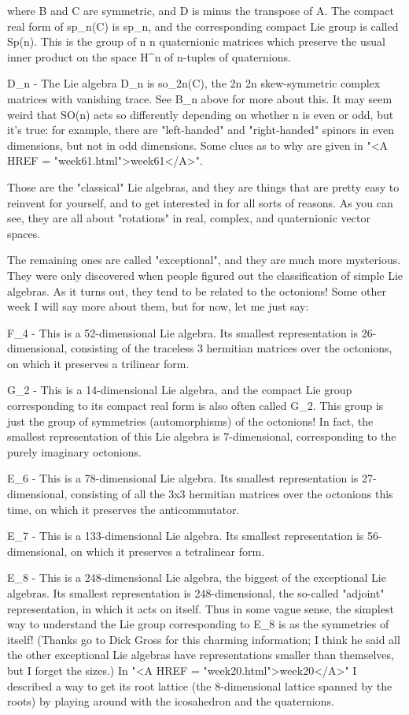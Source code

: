 where B and C are symmetric, and D is minus the transpose of A.  The
compact real form of sp_{n}(C) is sp_{n}, and the
corresponding compact Lie group is called Sp(n).  This is the group of
n \times  n quaternionic matrices which preserve the usual inner product on
the space H^{n} of n-tuples of quaternions.

D_{n} - The Lie algebra D_{n} is so_{2n}(C),
the 2n \times  2n skew-symmetric complex matrices with vanishing trace.  See
B_{n} above for more about this.  It may seem weird that SO(n)
acts so differently depending on whether n is even or odd, but it's
true: for example, there are "left-handed" and "right-handed" spinors
in even dimensions, but not in odd dimensions.  Some clues as to why
are given in "<A HREF = "week61.html">week61</A>".

Those are the "classical" Lie algebras, and they are things that are
pretty easy to reinvent for yourself, and to get interested in for all
sorts of reasons.  As you can see, they are all about "rotations" in 
real, complex, and quaternionic vector spaces.  

The remaining ones are called "exceptional", and they are much more
mysterious.  They were only discovered when people figured out the
classification of simple Lie algebras.  As it turns out, they tend to be
related to the octonions!  Some other week I will say more about them,
but for now, let me just say:

F_{4} - This is a 52-dimensional Lie algebra.  Its smallest
representation is 26-dimensional, consisting of the traceless
3 hermitian matrices over the octonions, on which it preserves
a trilinear form.  

G_{2} - This is a 14-dimensional Lie algebra, and the
compact Lie group corresponding to its compact real form is also often
called G_{2}.  This group is just the group of symmetries
(automorphisms) of the octonions!  In fact, the smallest
representation of this Lie algebra is 7-dimensional, corresponding to
the purely imaginary octonions.

E_{6} - This is a 78-dimensional Lie algebra.  Its smallest
representation is 27-dimensional, consisting of all the 3x3 hermitian
matrices over the octonions this time, on which it preserves the
anticommutator.  

E_{7} - This is a 133-dimensional Lie algebra.  Its smallest 
representation is 56-dimensional, on which it preserves a tetralinear
form. 

E_{8} - This is a 248-dimensional Lie algebra, the biggest
of the exceptional Lie algebras.  Its smallest representation is
248-dimensional, the so-called "adjoint" representation, in which it
acts on itself.  Thus in some vague sense, the simplest way to
understand the Lie group corresponding to E_{8} is as the
symmetries of itself!  (Thanks go to Dick Gross for this charming
information; I think he said all the other exceptional Lie algebras
have representations smaller than themselves, but I forget the sizes.)
In "<A HREF = "week20.html">week20</A>" I described a way to get its
root lattice (the 8-dimensional lattice spanned by the roots) by
playing around with the icosahedron and the quaternions.


